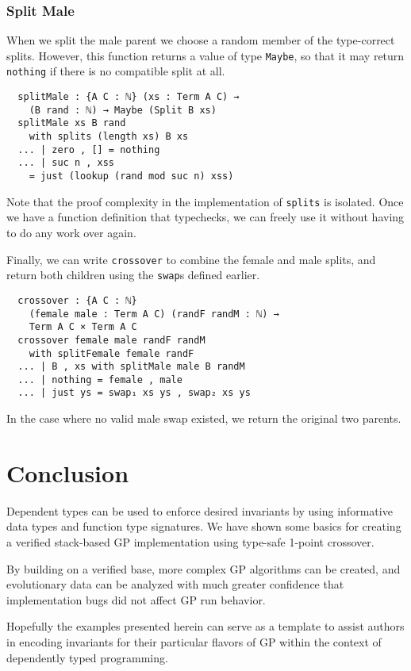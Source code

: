 \documentclass{acm_proc_article-sp}
\begin{document}
\subsubsection{Split Male}

When we split the male parent we choose a random member of the
type-correct splits. However, this function returns a value of type
\texttt{Maybe}, so that it may return \texttt{nothing} if there is no
compatible split at all.

\begin{verbatim}
  splitMale : {A C : ℕ} (xs : Term A C) →
    (B rand : ℕ) → Maybe (Split B xs)
  splitMale xs B rand
    with splits (length xs) B xs
  ... | zero , [] = nothing
  ... | suc n , xss
    = just (lookup (rand mod suc n) xss)
\end{verbatim}

Note that the proof complexity in the implementation of
\texttt{splits} is isolated. Once we have a function definition that
typechecks, we can freely use it without having to do any work over
again.

Finally, we can write \texttt{crossover} to combine the female and
male splits, and return both children using the \texttt{swap}s defined
earlier.

\begin{verbatim}
  crossover : {A C : ℕ}
    (female male : Term A C) (randF randM : ℕ) →
    Term A C × Term A C
  crossover female male randF randM
    with splitFemale female randF
  ... | B , xs with splitMale male B randM
  ... | nothing = female , male
  ... | just ys = swap₁ xs ys , swap₂ xs ys
\end{verbatim}

In the case where no valid male swap existed, we return the original
two parents.

\section{Conclusion}

Dependent types can be used to enforce desired invariants by using
informative data types and function type signatures. We have shown
some basics for creating a verified stack-based GP implementation
using type-safe 1-point crossover.

By building on a verified base, more complex GP algorithms can be
created, and evolutionary data can be analyzed with much greater
confidence that implementation bugs did not affect GP run behavior.

Hopefully the examples presented herein can serve as a template to
assist authors in encoding invariants for their particular flavors of
GP within the context of dependently typed programming.



\end{document}
